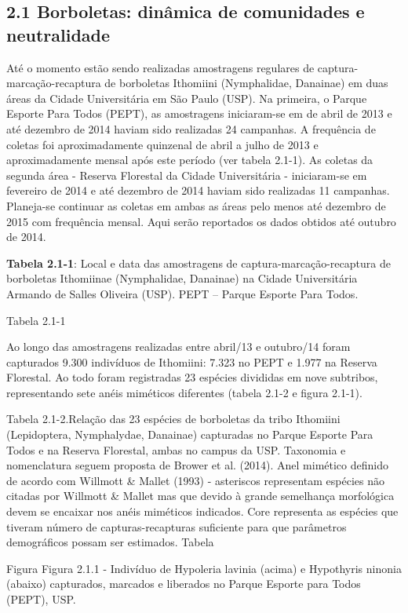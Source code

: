 \subsection{2.1 Borboletas: dinâmica de comunidades e neutralidade} %
\label{sec:dinamica-temporal-borb} 
Até o momento estão sendo realizadas amostragens regulares de captura-marcação-recaptura de borboletas Ithomiini (Nymphalidae, Danainae) em duas áreas da Cidade Universitária em São Paulo (USP). Na primeira, o Parque Esporte Para Todos (PEPT), as amostragens iniciaram-se em de abril de 2013 e até dezembro de 2014 haviam sido realizadas 24 campanhas. A frequência de coletas foi aproximadamente quinzenal de abril a julho de 2013 e aproximadamente mensal após este período (ver tabela 2.1-1). As coletas da segunda área - Reserva Florestal da Cidade Universitária - iniciaram-se em fevereiro de 2014 e até dezembro de 2014 haviam sido realizadas 11 campanhas. Planeja-se continuar as coletas em ambas as áreas pelo menos até dezembro de 2015 com frequência mensal. Aqui serão reportados os dados obtidos até outubro de 2014.

\textbf{Tabela 2.1-1}: Local e data das amostragens de captura-marcação-recaptura de borboletas Ithomiinae (Nymphalidae, Danainae) na Cidade Universitária Armando de Salles Oliveira (USP). PEPT – Parque Esporte Para Todos.

Tabela 2.1-1

Ao longo das amostragens realizadas entre abril/13 e outubro/14 foram capturados 9.300 indivíduos de Ithomiini: 7.323 no PEPT e 1.977 na Reserva Florestal. Ao todo foram registradas 23 espécies divididas em nove subtribos, representando sete anéis miméticos diferentes (tabela 2.1-2 e figura 2.1-1). 

Tabela 2.1-2.Relação das 23 espécies de borboletas da tribo Ithomiini (Lepidoptera, Nymphalydae, Danainae) capturadas no Parque Esporte Para Todos e na Reserva Florestal, ambas no campus da USP. Taxonomia e nomenclatura seguem proposta de Brower et al. (2014). Anel mimético definido de acordo com Willmott & Mallet (1993) - asteriscos representam espécies não citadas por Willmott & Mallet mas que devido à grande semelhança morfológica devem se encaixar nos anéis miméticos indicados. Core representa as espécies que tiveram número de capturas-recapturas suficiente para que parâmetros demográficos possam ser estimados.
Tabela

Figura
Figura 2.1.1 - Indivíduo de Hypoleria lavinia (acima) e Hypothyris ninonia (abaixo) capturados, marcados e liberados no Parque Esporte para Todos (PEPT), USP.

